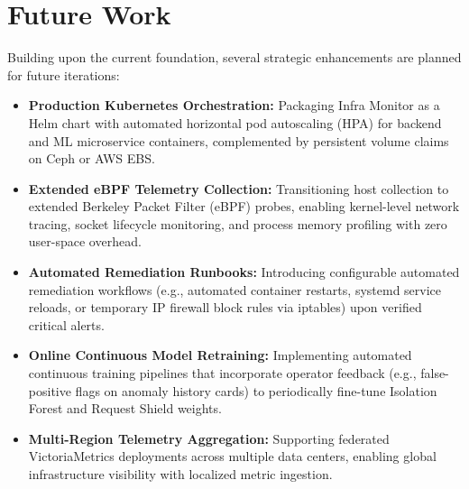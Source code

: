 \section{Future Work}
Building upon the current foundation, several strategic enhancements are planned for future iterations:
\begin{itemize}
  \item \textbf{Production Kubernetes Orchestration:} Packaging Infra Monitor as a Helm chart with automated horizontal pod autoscaling (HPA) for backend and ML microservice containers, complemented by persistent volume claims on Ceph or AWS EBS.
  
  \item \textbf{Extended eBPF Telemetry Collection:} Transitioning host collection to extended Berkeley Packet Filter (eBPF) probes, enabling kernel-level network tracing, socket lifecycle monitoring, and process memory profiling with zero user-space overhead.
  
  \item \textbf{Automated Remediation Runbooks:} Introducing configurable automated remediation workflows (e.g., automated container restarts, systemd service reloads, or temporary IP firewall block rules via iptables) upon verified critical alerts.
  
  \item \textbf{Online Continuous Model Retraining:} Implementing automated continuous training pipelines that incorporate operator feedback (e.g., false-positive flags on anomaly history cards) to periodically fine-tune Isolation Forest and Request Shield weights.
  
  \item \textbf{Multi-Region Telemetry Aggregation:} Supporting federated VictoriaMetrics deployments across multiple data centers, enabling global infrastructure visibility with localized metric ingestion.
\end{itemize}
